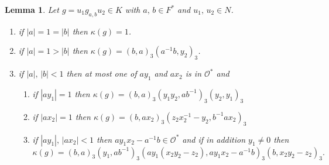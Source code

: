 \documentclass[12pt]{amsart}
\newcommand{\abs}[1]{\left|{#1}\right|}
\renewcommand{\O}{\mathcal{O}}
\newtheorem{lemma}[theorem]{Lemma}
\theoremstyle{remark}
\begin{document}
\begin{lemma}\label{lem kappa}
Let $g=u_1g_{a,b}u_2\in K$ with $a,\,b\in F^*$ and $u_1,\,u_2\in N$. 
\begin{enumerate}
\item if $\abs{a}=1=\abs{b}$ then $\kappa(g)=1$.
\item\label{case 1=a>b} if $\abs{a}=1>\abs{b}$ then $\kappa(g)=(b,a)_3(a^{-1}b,y_2)_3$.
\item if $\abs{a},\,\abs{b}<1$ then at most one of $ay_1$ and $ax_2$ is in $\O^*$ and 
\begin{enumerate}
\item if $\abs{ay_1}=1$ then $\kappa(g)=(b,a)_3(y_1y_2,ab^{-1})_3(y_2,y_1)_3$
\item if $\abs{ax_2}=1$ then $\kappa(g)=(b,ax_2)_3(z_2x_2^{-1}-y_2,b^{-1}ax_2)_3$
\item if $\abs{ay_1},\,\abs{ax_2}<1$ then $ay_1x_2-a^{-1}b\in\O^*$ and if in addition $y_1\ne 0$ then 
\[
\kappa(g)=(b,a)_3(y_1,ab^{-1})_3(ay_1(x_2y_2-z_2),ay_1x_2-a^{-1}b)_3(b,x_2y_2-z_2)_3.
\]
\end{enumerate}
\end{enumerate}
\end{lemma}
\end{document}
